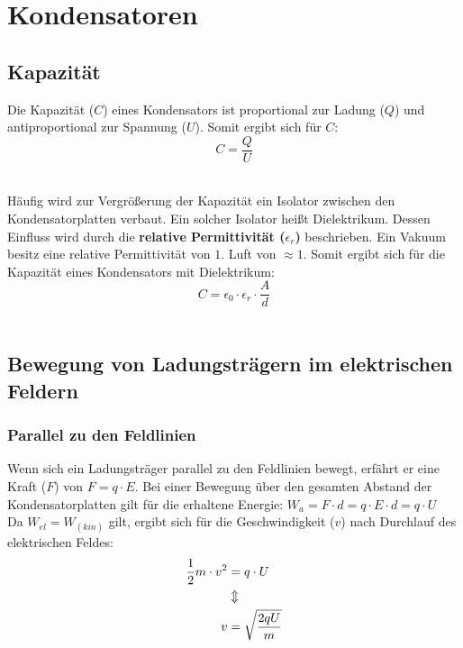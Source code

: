 \documentclass[a4paper]{article}
\begin{document}
\section{Kondensatoren}
\subsection{Kapazität}

Die Kapazität ($C$) eines Kondensators ist proportional zur Ladung ($Q$) und antiproportional zur Spannung ($U$).
Somit ergibt sich für $C$:
\Large$$C = \dfrac{Q}{U}$$\\ \normalsize

Häufig wird zur Vergrößerung der Kapazität ein Isolator zwischen den Kondensatorplatten verbaut. Ein solcher Isolator
heißt Dielektrikum. Dessen Einfluss wird durch die \textbf{relative Permittivität ($\epsilon_r$)} beschrieben. Ein Vakuum besitz eine
relative Permittivität von $1$. Luft von $\approx 1$. Somit ergibt sich für die Kapazität eines Kondensators mit
Dielektrikum:\\
\Large$$C = \epsilon_0 \cdot \epsilon_r \cdot \dfrac{A}{d}$$\\ \normalsize



\newpage
\subsection{Bewegung von Ladungsträgern im elektrischen Feldern}
\subsubsection{Parallel zu den Feldlinien}

Wenn sich ein Ladungsträger parallel zu den Feldlinien bewegt, erfährt er eine Kraft ($F$) von $F = q \cdot E$.
Bei einer Bewegung über den gesamten Abstand der Kondensatorplatten gilt für die erhaltene Energie:
$W_a = F \cdot d = q \cdot E \cdot d = q \cdot U$\\
Da $W_{el} = W_(kin)$ gilt, ergibt sich für die Geschwindigkeit ($v$) nach Durchlauf des elektrischen
Feldes:\\
\begin{align*}
	\small \frac{1}{2}m \cdot v^2 &= q \cdot U\\
	 &\Updownarrow\\
	\Large v &= \sqrt{\dfrac{2qU}{m}}\\ \normalsize
\end{align*}
\end{document}
